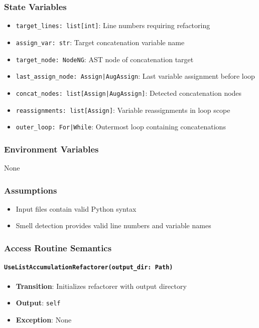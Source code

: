 \documentclass[12pt, titlepage]{article}
\begin{document}
  \subsubsection{State Variables}
  \begin{itemize}
  \item \texttt{target\_lines: list[int]}: Line numbers requiring refactoring
  \item \texttt{assign\_var: str}: Target concatenation variable name
  \item \texttt{target\_node: NodeNG}: AST node of concatenation target
  \item \texttt{last\_assign\_node: Assign|AugAssign}: Last variable assignment before loop
  \item \texttt{concat\_nodes: list[Assign|AugAssign]}: Detected concatenation nodes
  \item \texttt{reassignments: list[Assign]}: Variable reassignments in loop scope
  \item \texttt{outer\_loop: For|While}: Outermost loop containing concatenations
  \end{itemize}
  
  \subsubsection{Environment Variables}
  None
  
  \subsubsection{Assumptions}
  \begin{itemize}
  \item Input files contain valid Python syntax
  \item Smell detection provides valid line numbers and variable names
  \end{itemize}
  
  \subsubsection{Access Routine Semantics}
  
  \paragraph{\texttt{UseListAccumulationRefactorer(output\_dir: Path)}}
  \begin{itemize}
  \item \textbf{Transition}: Initializes refactorer with output directory
  \item \textbf{Output}: \texttt{self}
  \item \textbf{Exception}: None
  \end{itemize}
  
\end{document}
